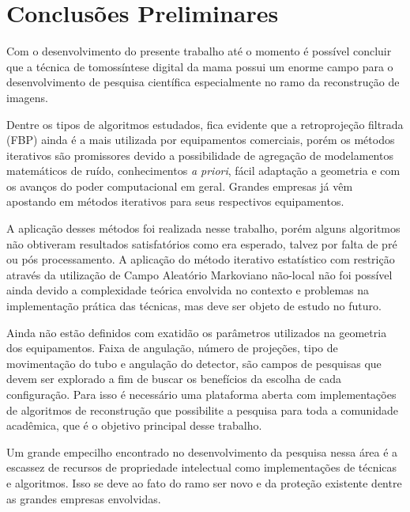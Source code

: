 \chapter[Conclusões Preliminares]{Conclusões Preliminares}\label{Capitulo6}

Com o desenvolvimento do presente trabalho até o momento é possível concluir que a técnica de tomossíntese digital da mama possui um enorme campo para o desenvolvimento de pesquisa científica especialmente no ramo da reconstrução de imagens. 

Dentre os tipos de algoritmos estudados, fica evidente que a retroprojeção filtrada (\acs{FBP}) ainda é a mais utilizada por equipamentos comerciais, porém os métodos iterativos são promissores devido a possibilidade de agregação de modelamentos matemáticos de ruído, conhecimentos \textit{a priori}, fácil adaptação a geometria e com os avanços do poder computacional em geral. Grandes empresas já vêm apostando em métodos iterativos para seus respectivos equipamentos.

A aplicação desses métodos foi realizada nesse trabalho, porém alguns algoritmos não obtiveram resultados satisfatórios como era esperado, talvez por falta de pré ou pós processamento. A aplicação do método iterativo estatístico com restrição através da utilização de Campo Aleatório Markoviano não-local não foi possível ainda devido a complexidade teórica envolvida no contexto e problemas na implementação prática das técnicas, mas deve ser objeto de estudo no futuro.

Ainda não estão definidos com exatidão os parâmetros utilizados na geometria dos equipamentos. Faixa de angulação, número de projeções, tipo de movimentação do tubo e angulação do detector, são campos de pesquisas que devem ser explorado a fim de buscar os benefícios da escolha de cada configuração. Para isso é necessário uma plataforma aberta com implementações de algoritmos de reconstrução que possibilite a pesquisa para toda a comunidade acadêmica, que é o objetivo principal desse trabalho.  

Um grande empecilho encontrado no desenvolvimento da pesquisa nessa área é a escassez de recursos de propriedade intelectual como implementações de técnicas e algoritmos. Isso se deve ao fato do ramo ser novo e da proteção existente dentre as grandes empresas envolvidas.       



